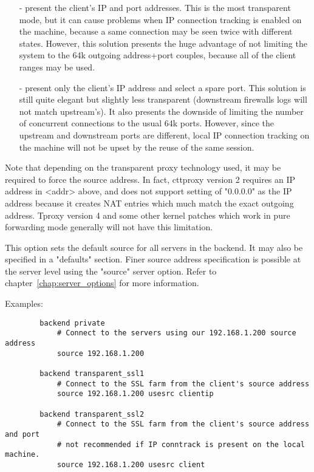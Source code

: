 {  \begin{itemize}
  \item[-] present the client's IP and port addresses. This is the most transparent
      mode, but it can cause problems when IP connection tracking is enabled on
      the machine, because a same connection may be seen twice with different
      states. However, this solution presents the huge advantage of not
      limiting the system to the 64k outgoing address+port couples, because all
      of the client ranges may be used.

   \item[-] present only the client's IP address and select a spare port. This
      solution is still quite elegant but slightly less transparent (downstream
      firewalls logs will not match upstream's). It also presents the downside
      of limiting the number of concurrent connections to the usual 64k ports.
      However, since the upstream and downstream ports are different, local IP
      connection tracking on the machine will not be upset by the reuse of the
      same session.
  \end{itemize}

  Note that depending on the transparent proxy technology used, it may be
  required to force the source address. In fact, cttproxy version 2 requires an
  IP address in <addr> above, and does not support setting of "0.0.0.0" as the
  IP address because it creates NAT entries which much match the exact outgoing
  address. Tproxy version 4 and some other kernel patches which work in pure
  forwarding mode generally will not have this limitation.

  This option sets the default source for all servers in the backend. It may
  also be specified in a "defaults" section. Finer source address specification
  is possible at the server level using the "source" server option. Refer to
  chapter~\ref{chap:server_options} for more information.

  Examples:
  \begin{verbatim}
        backend private
            # Connect to the servers using our 192.168.1.200 source address
            source 192.168.1.200

        backend transparent_ssl1
            # Connect to the SSL farm from the client's source address
            source 192.168.1.200 usesrc clientip

        backend transparent_ssl2
            # Connect to the SSL farm from the client's source address and port
            # not recommended if IP conntrack is present on the local machine.
            source 192.168.1.200 usesrc client


\end{verbatim}}
